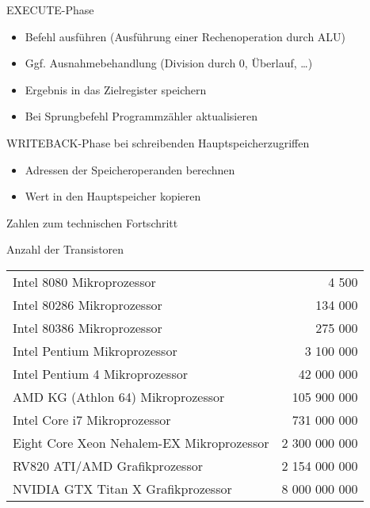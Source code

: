 \documentclass[utf8,9pt]{beamer}
\begin{document}
\begin{frame}{}{}

\begin{block}{\small EXECUTE-Phase}
\begin{itemize}
\item Befehl ausführen (Ausführung einer Rechenoperation durch ALU)
\item Ggf. Ausnahmebehandlung (Division durch 0, Überlauf, \dots)
\item Ergebnis in das Zielregister speichern
\item Bei Sprungbefehl Programmzähler aktualisieren
\end{itemize}
\end{block}
\begin{block}{\small WRITEBACK-Phase}
bei schreibenden Hauptspeicherzugriffen
  \begin{itemize} 
  \item Adressen der Speicheroperanden berechnen
  \item Wert in den Hauptspeicher kopieren
  \end{itemize}
\end{block}
\end{frame}















\begin{frame}{Zahlen zum technischen Fortschritt}{}

\begin{block}{Anzahl der Transistoren}
\begin{tabular}{lr}
 Intel 8080 Mikroprozessor &    4 500 \\
 Intel 80286 Mikroprozessor &  134 000 \\
 Intel 80386 Mikroprozessor &  275 000 \\
 Intel Pentium Mikroprozessor &        3 100 000 \\
 Intel Pentium 4 Mikroprozessor &      42 000 000 \\
 AMD KG (Athlon 64) Mikroprozessor &   105 900 000 \\
 Intel Core i7 Mikroprozessor &        731 000 000 \\
 Eight Core Xeon Nehalem-EX Mikroprozessor &           2 300 000 000 \\
 RV820 ATI/AMD Grafikprozessor &       2 154 000 000 \\
 NVIDIA GTX Titan X Grafikprozessor &        8 000 000 000 \\
\end{tabular}
\end{block}
\end{frame}
\end{document}

